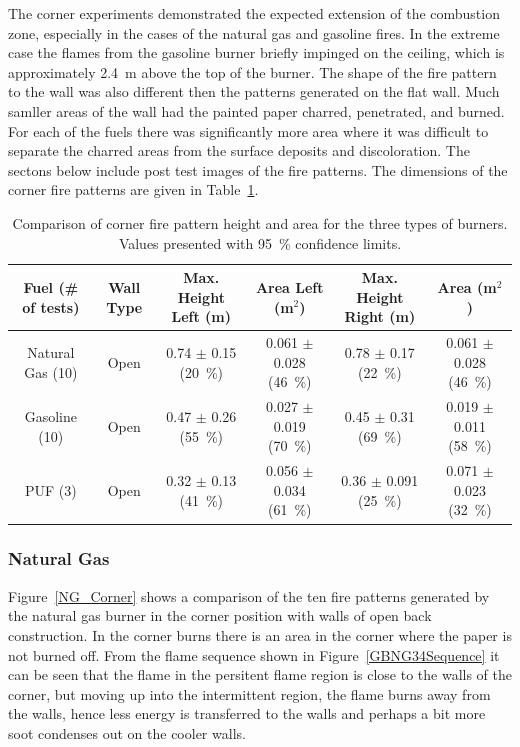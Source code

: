 \documentclass[twoside]{uocthesis}
\begin{document}
{The corner experiments demonstrated the expected extension of the combustion zone, especially in the cases of the natural gas and gasoline fires.  In the extreme case the flames from the gasoline burner briefly impinged on the ceiling, which is approximately 2.4~m above the top of the burner. The shape of the fire pattern to the wall was also different then the patterns generated on the flat wall.  Much samller areas of the wall had the painted paper charred, penetrated, and burned.  For each of the fuels there was significantly more area where it was difficult to separate the charred areas from the surface deposits and discoloration. The sectons below include post test images of the fire patterns.  The dimensions of the corner fire patterns are given in Table~\ref{tab:Fire_Pattern_Dimensions_Corners}.

\begin{table}
	\centering
	\footnotesize
	\begin{tabular}{|c|c|c|c|c|c|}
	\hline
	Fuel (\# of tests)      &   Wall Type   & Max. Height Left (m)	 	& Area Left (m$^2$)				&  Max. Height Right (m)        & Area (m$^2$)  				\\ \hline \hline
		Natural Gas (10)    &   Open 		& 0.74 	$\pm$ 0.15 (20~\%)  & 0.061 $\pm$ 0.028 (46~\%) 	&  0.78 $\pm$ 0.17 (22~\%) 	 	& 0.061 $\pm$ 0.028 (46~\%)  	\\
		Gasoline (10)       &   Open    	& 0.47	$\pm$ 0.26 (55~\%)  & 0.027 $\pm$ 0.019 (70~\%) 	&  0.45 $\pm$ 0.31 (69~\%)  	& 0.019 $\pm$ 0.011 (58~\%)\\
		PUF (3)       		&   Open 		& 0.32	$\pm$ 0.13 (41~\%)  & 0.056 $\pm$ 0.034 (61~\%) 	&  0.36 $\pm$ 0.091 (25~\%)  	& 0.071 $\pm$ 0.023 (32~\%)\\
	\hline
	\end{tabular}
	\caption[Comparison of corner fire pattern height and area for the three types of burners]{Comparison of corner fire pattern height and area for the three types of burners. Values presented with 95~\% confidence limits.}
	\label{tab:Fire_Pattern_Dimensions_Corners}
\end{table}

\subsubsection{Natural Gas}

Figure~\ref{NG_Corner} shows a comparison of the ten fire patterns generated by the natural gas burner in the corner position with walls of open back construction. In the corner burns there is an area in the corner where the paper is not burned off.  From the flame sequence shown in Figure~\ref{GBNG34Sequence} it can be seen that the flame in the persitent flame region is close to the walls of the corner, but moving up into the intermittent region, the flame burns away from the walls, hence less energy is transferred to the walls and perhaps a bit more soot condenses out on the cooler walls.    

}
\end{document}
